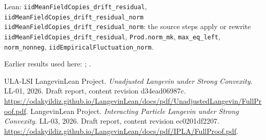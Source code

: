 \documentclass[11pt,a4paper]{article}
\begin{document}
\begin{leanbox}{Lean: \texttt{iidMeanFieldCopies\_\allowbreak{}drift\_\allowbreak{}residual}, \texttt{iidMeanFieldCopies\_\allowbreak{}drift\_\allowbreak{}residual\_\allowbreak{}norm}}
\texttt{iid\allowbreak{}Mean\allowbreak{}Field\allowbreak{}Copies\_\allowbreak{}drift\_\allowbreak{}residual\_\allowbreak{}norm}: the source steps apply or rewrite \texttt{iid\allowbreak{}Mean\allowbreak{}Field\allowbreak{}Copies\_\allowbreak{}drift\_\allowbreak{}residual}, \texttt{Prod.\allowbreak{}norm\_\allowbreak{}mk}, \texttt{max\_\allowbreak{}eq\_\allowbreak{}left}, \texttt{norm\_\allowbreak{}nonneg}, \texttt{iid\allowbreak{}Empirical\allowbreak{}Fluctuation\_\allowbreak{}norm}.
\end{leanbox}


Earlier results used here: \cite[Section~3.13.2]{LangevinLean2026ULASC}; \cite[Section~3.1.1]{LangevinLean2026IPLA}.

\begin{thebibliography}{ULA-LSI}
LangevinLean Project. \emph{Unadjusted Langevin under Strong Convexity}. LL-01, 2026. Draft report, content revision d34ead06987c. \url{https://odakyildiz.github.io/LangevinLean/docs/pdf/UnadjustedLangevin/FullProof.pdf}.
LangevinLean Project. \emph{Interacting Particle Langevin under Strong Convexity}. LL-03, 2026. Draft report, content revision ec0201df2207. \url{https://odakyildiz.github.io/LangevinLean/docs/pdf/IPLA/FullProof.pdf}.
\end{thebibliography}
\end{document}

